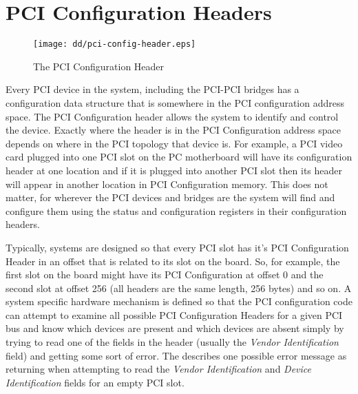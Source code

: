 \section{PCI Configuration Headers}
\begin{figure}
\begin{center}
{\centering \texttt{[image: dd/pci-config-header.eps]} \par}
\end{center}
\caption{The PCI Configuration Header}
\label{pci-configuration-header}
\end{figure}
Every PCI device in the system, including the PCI-PCI bridges
has a configuration data structure that is somewhere in
the PCI configuration address space.
The PCI Configuration header allows the system to identify and
control the device.
Exactly where the header is in the PCI Configuration address space
depends on where in the PCI topology that device is.
For example, a PCI video card plugged into one PCI slot 
on the PC motherboard will 
have its configuration header at one location and if it is
plugged into another PCI slot then its header will appear 
in another location in PCI Configuration memory.
This does not matter, for wherever the PCI devices and bridges
are the system will find and configure them using the status
and configuration registers in their configuration headers.

Typically, systems are designed so that every PCI slot has it's 
PCI Configuration Header in an offset that is related to
its slot on the board.  
So, for example, the first slot on the board might have its
PCI Configuration at offset 0 and the second slot at offset
256 (all headers are the same length, 256 bytes) and so on.
A system specific hardware mechanism is defined so that the PCI 
configuration code can attempt to examine all possible PCI Configuration
Headers for a given PCI bus and know which devices are present
and which devices are absent simply by trying to read one of
the fields in the header (usually the {\em Vendor Identification}
field) and getting some sort of error.
The \cite[PCI Local Bus Specification]{bib-pci-specification} describes
one possible error message as returning  when attempting to
read the {\em Vendor Identification} and {\em Device Identification} 
fields for an empty PCI slot.

